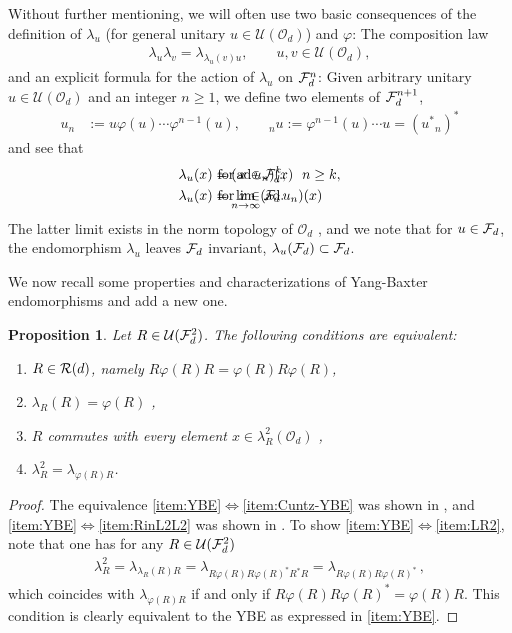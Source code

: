 \documentclass[12pt,a4paper]{amsart}
\numberwithin{equation}{section}
\newtheorem{proposition}[theorem]{Proposition}
\theoremstyle{remark}
\DeclareMathOperator{\ad}{ad}
\newcommand{\la}{\lambda}
\newcommand{\CO}[0]{\mathcal{O}} \newcommand{\CP}[0]{\mathcal{P}}
\newcommand{\CU}[0]{\mathcal{U}} \newcommand{\CV}[0]{\mathcal{V}}
\begin{document}
\medskip

Without further mentioning, we will often use two basic consequences of the definition of $\la_u$ (for general unitary $u\in\CU(\CO_d)$) and $\varphi$: The composition law 
\begin{align}
 \la_u\la_v=\la_{\la_u(v)u}
 ,\qquad 
 u,v\in\CU(\CO_d),
\end{align}
and an explicit formula for the action of $\la_u$ on $\mathcal{F}_d^n$: Given arbitrary unitary $u \in \CU(\CO_d)$ and an integer $n\geq 1$, we define two elements of $\mathcal{F}_d^{n+1}$,
\begin{align}\label{eq:Un-nU}
 u_n &:= u \varphi(u) \cdots \varphi^{n-1}(u),\qquad 
 {}_nu:=\varphi^{n-1}(u)\cdots u=({u^*}_n)^*
\end{align}
and see that 
\begin{align}\label{eq:lau-explicit}
	\la_u(x) &= (\ad u_n)(x)               &&\hspace*{-3cm}\text{for } x\in\CF_d^k,\quad n\geq k,\\
	\la_u(x) &= \lim_{n\to\infty}(\ad u_n)(x) &&\hspace*{-3cm}\text{for } x\in\CF_d.
 \label{eq:lau-limit-formula}
\end{align}
The latter limit exists in the norm topology of $\CO_d$ \cite{Cuntz:1998}, and we note that for $u\in\mathcal{F}_d$, the endomorphism $\la_u$ leaves $\mathcal{F}_d$ invariant, $\la_u(\CF_d)\subset\CF_d$.

We now recall some properties and characterizations of Yang-Baxter endomorphisms and add a new one. 

\begin{proposition}\label{prop:ybe-od}
    Let $R \in \CU(\CF_d^2)$. The following conditions are equivalent:
    \begin{enumerate}
        \item\label{item:YBE} $R\in\mathcal{R}(d)$, namely $R \varphi(R) R = \varphi(R) R \varphi(R)$,
        \item\label{item:Cuntz-YBE} $\lambda_R(R) = \varphi(R)$ \cite{Cuntz:1998},
        \item\label{item:RinL2L2} $R$ commutes with every element $x\in\la_R^2(\CO_d)$ \cite{ContiHongSzymanski:2012},
        \item\label{item:LR2} $\lambda_R^2 = \lambda_{\varphi(R)R}$.
    \end{enumerate}
\end{proposition}
\begin{proof}
    The equivalence \ref{item:YBE}$\iff$\ref{item:Cuntz-YBE} was shown in \cite{Cuntz:1998}, and \ref{item:YBE}$\iff$\ref{item:RinL2L2} was shown in \cite{ContiHongSzymanski:2012}. To show \ref{item:YBE}$\iff$\ref{item:LR2}, note that one has for any $R\in\CU(\CF_d^2)$
    \begin{align*}
        \lambda_R^2 = \lambda_{\lambda_R(R) R} = \lambda_{R \varphi(R) R \varphi(R)^* R^* R} = \lambda_{R \varphi(R) R \varphi(R)^*}\,, 
    \end{align*}
    which coincides with $\la_{\varphi(R)R}$ if and only if $R \varphi(R) R \varphi(R)^* = \varphi(R)R$. This condition is clearly equivalent to the YBE as expressed in \ref{item:YBE}.  
\end{proof}
\end{document}
